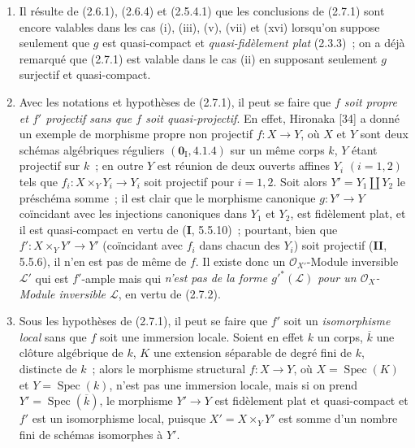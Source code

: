 \begin{remarks}[2.7.3]
\label{IV.2.7.3-fr}
\begin{enumerate}
\item[(i)] Il résulte de (2.6.1), (2.6.4) et (2.5.4.1) que les conclusions
de (2.7.1) sont encore valables dans les cas (i), (iii), (v), (vii) et
(xvi) lorsqu'on suppose seulement que $g$ est quasi-compact et
\emph{quasi-fidèlement plat} (2.3.3)~; on a déjà remarqué que (2.7.1) est valable
dans le cas (ii) en supposant seulement $g$ surjectif et quasi-compact.

\item[(ii)] Avec les notations et hypothèses de (2.7.1), il peut se faire
que \emph{$f$ soit propre et $f'$ projectif sans que $f$ soit quasi-projectif}. En
effet, Hironaka [34] a donné un exemple de morphisme propre non projectif
$f:X\to Y$, où $X$ et $Y$ sont deux schémas algébriques réguliers
$(\mathbf{0}_{\mathrm I},4.1.4)$ sur un même corps $k$, $Y$ étant projectif sur $k$~;
en outre $Y$ est réunion de deux ouverts affines $Y_i$ $(i=1,2)$ tels que
$f_i:X\times_Y Y_i\to Y_i$ soit projectif pour $i=1,2$. Soit alors
$Y'=Y_1\amalg Y_2$ le préschéma somme~; il est clair que le morphisme
canonique $g:Y'\to Y$ coïncidant avec les injections canoniques dans $Y_1$
et $Y_2$, est fidèlement plat, et il est quasi-compact en vertu de
(\textbf{I}, 5.5.10)~; pourtant, bien que $f':X\times_Y Y'\to Y'$ (coïncidant avec
$f_i$ dans chacun des $Y_i$) soit projectif (\textbf{II}, 5.5.6), il n'en est pas de
même de $f$. Il existe donc un $\mathcal O_{X'}$-Module inversible
$\mathcal L'$ qui est $f'$-ample mais qui \emph{n'est pas de la forme
$g'^*(\mathcal L)$ pour un $\mathcal O_X$-Module inversible $\mathcal L$}, en
vertu de (2.7.2).

\item[(iii)] Sous les hypothèses de (2.7.1), il peut se faire que $f'$ soit
un \emph{isomorphisme local} sans que $f$ soit une immersion locale. Soient en
effet $k$ un corps, $\overline k$ une clôture algébrique de $k$, $K$ une
extension séparable de degré fini de $k$, distincte de $k$~; alors le
morphisme structural $f:X\to Y$, où $X=\operatorname{Spec}(K)$ et
$Y=\operatorname{Spec}(k)$, n'est pas une immersion locale, mais si on prend
$Y'=\operatorname{Spec}(\overline k)$, le morphisme $Y'\to Y$ est
fidèlement plat et quasi-compact et $f'$ est un isomorphisme local, puisque
$X'=X\times_Y Y'$ est somme d'un nombre fini de schémas isomorphes à $Y'$.
\end{enumerate}
\end{remarks}


